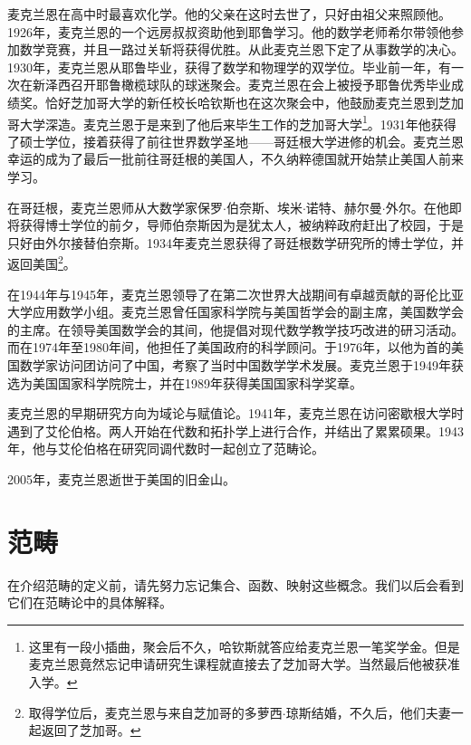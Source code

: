 \documentclass{article}
\begin{document}
麦克兰恩在高中时最喜欢化学。他的父亲在这时去世了，只好由祖父来照顾他。1926年，麦克兰恩的一个远房叔叔资助他到耶鲁学习。他的数学老师希尔带领他参加数学竞赛，并且一路过关斩将获得优胜。从此麦克兰恩下定了从事数学的决心。1930年，麦克兰恩从耶鲁毕业，获得了数学和物理学的双学位。毕业前一年，有一次在新泽西召开耶鲁橄榄球队的球迷聚会。麦克兰恩在会上被授予耶鲁优秀毕业成绩奖\cite{Wiki-Mac-Lane}。恰好芝加哥大学的新任校长哈钦斯也在这次聚会中，他鼓励麦克兰恩到芝加哥大学深造。麦克兰恩于是来到了他后来毕生工作的芝加哥大学\footnote{这里有一段小插曲，聚会后不久，哈钦斯就答应给麦克兰恩一笔奖学金。但是麦克兰恩竟然忘记申请研究生课程就直接去了芝加哥大学。当然最后他被获准入学。}。1931年他获得了硕士学位，接着获得了前往世界数学圣地——哥廷根大学进修的机会。麦克兰恩幸运的成为了最后一批前往哥廷根的美国人，不久纳粹德国就开始禁止美国人前来学习。

在哥廷根，麦克兰恩师从大数学家保罗$\cdot$伯奈斯、埃米$\cdot$诺特、赫尔曼$\cdot$外尔。在他即将获得博士学位的前夕，导师伯奈斯因为是犹太人，被纳粹政府赶出了校园，于是只好由外尔接替伯奈斯。1934年麦克兰恩获得了哥廷根数学研究所的博士学位，并返回美国\footnote{取得学位后，麦克兰恩与来自芝加哥的多萝西$\cdot$琼斯结婚，不久后，他们夫妻一起返回了芝加哥。}。

在1944年与1945年，麦克兰恩领导了在第二次世界大战期间有卓越贡献的哥伦比亚大学应用数学小组。麦克兰恩曾任国家科学院与美国哲学会的副主席，美国数学会的主席。在领导美国数学会的其间，他提倡对现代数学教学技巧改进的研习活动。而在1974年至1980年间，他担任了美国政府的科学顾问。于1976年，以他为首的美国数学家访问团访问了中国，考察了当时中国数学学术发展。麦克兰恩于1949年获选为美国国家科学院院士，并在1989年获得美国国家科学奖章。

麦克兰恩的早期研究方向为域论与赋值论。1941年，麦克兰恩在访问密歇根大学时遇到了艾伦伯格。两人开始在代数和拓扑学上进行合作，并结出了累累硕果。1943年，他与艾伦伯格在研究同调代数时一起创立了范畴论。

2005年，麦克兰恩逝世于美国的旧金山。

\section{范畴}

在介绍范畴的定义前，请先努力忘记集合、函数、映射这些概念。我们以后会看到它们在范畴论中的具体解释。
\end{document}
